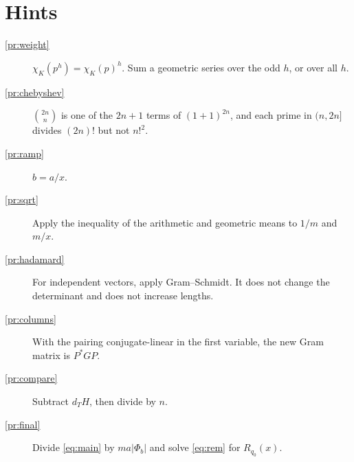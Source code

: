 \documentclass[reqno]{amsart}
\theoremstyle{definition}
\begin{document}
\section*{Hints}
\begin{description}
\item[\ref{pr:weight}] \(\chi_K(p^h) = \chi_K(p)^h\).  Sum a geometric
  series over the odd \(h\), or over all \(h\).
\item[\ref{pr:chebyshev}] \(\binom{2n}{n}\) is one of the \(2n + 1\)
  terms of \((1 + 1)^{2n}\), and each prime in \((n, 2n]\) divides
  \((2n)!\) but not \(n!^2\).
\item[\ref{pr:ramp}] \(b = a/x\).
\item[\ref{pr:sqrt}] Apply the inequality of the arithmetic and
  geometric means to \(1/m\) and \(m/x\).
\item[\ref{pr:hadamard}] For independent vectors, apply
  Gram--Schmidt.  It does not change the determinant and does not
  increase lengths.
\item[\ref{pr:columns}] With the pairing conjugate-linear in the first
  variable, the new Gram matrix is \(P^* G P\).
\item[\ref{pr:compare}] Subtract \(d_T H\), then divide by \(n\).
\item[\ref{pr:final}] Divide \eqref{eq:main} by
  \(m a \lvert \Phi_b \rvert\) and solve \eqref{eq:rem} for
  \(R_{q_0}(x)\).
\end{description}
\end{document}
